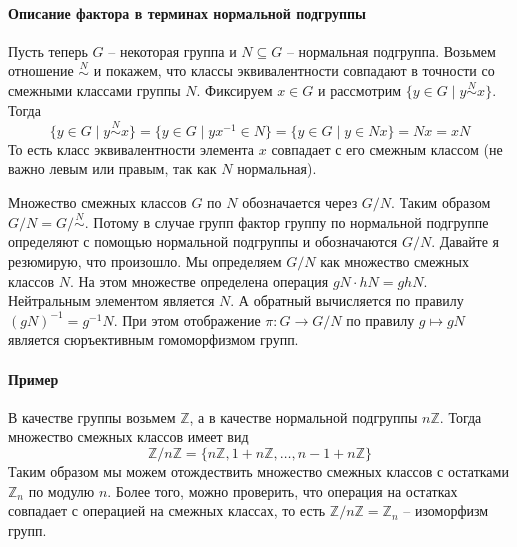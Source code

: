 \paragraph{Описание фактора в терминах нормальной подгруппы}

Пусть теперь $G$ -- некоторая группа и $N\subseteq G$ -- нормальная подгруппа.
Возьмем отношение $\stackrel{N}{\sim}$ и покажем, что классы эквивалентности совпадают в точности со смежными классами группы $N$.
Фиксируем $x\in G$ и рассмотрим $\{y \in G\mid y \stackrel{N}{\sim} x\}$.
Тогда
\[
\{y \in G\mid y \stackrel{N}{\sim} x\} = \{y\in G \mid yx^{-1}\in N\} = \{y\in G\mid y \in N x\} = N x = x N
\]
То есть класс эквивалентности элемента $x$ совпадает с его смежным классом (не важно левым или правым, так как $N$ нормальная).

Множество смежных классов $G$ по $N$ обозначается через $G/N$.
Таким образом $G/N = G/{\stackrel{N}{\sim}}$.
Потому в случае групп фактор группу по нормальной подгруппе определяют с помощью нормальной подгруппы и обозначаются $G/N$.
Давайте я резюмирую, что произошло.
Мы определяем $G/N$ как множество смежных классов $N$.
На этом множестве определена операция $gN \cdot hN = gh N$.
Нейтральным элементом является $N$.
А обратный вычисляется по правилу $(gN)^{-1} = g^{-1}N$.
При этом отображение $\pi \colon G\to G/N$ по правилу $g \mapsto gN$ является сюръективным гомоморфизмом групп.

\paragraph{Пример}

В качестве группы возьмем $\mathbb Z$, а в качестве нормальной подгруппы $n\mathbb Z$.
Тогда множество смежных классов имеет вид
\[
\mathbb Z / n\mathbb Z = \{n\mathbb Z, 1 + n \mathbb Z, \ldots, n-1 + n\mathbb Z\}
\]
Таким образом мы можем отождествить множество смежных классов с остатками $\mathbb Z_n$ по модулю $n$.
Более того, можно проверить, что операция на остатках совпадает с операцией на смежных классах, то есть $\mathbb Z/ n \mathbb Z = \mathbb Z_n$ -- изоморфизм групп.
